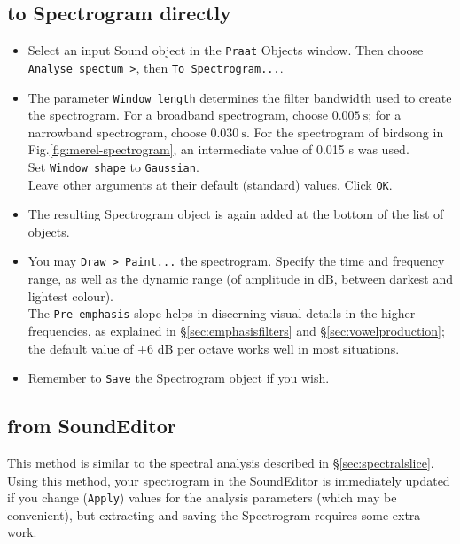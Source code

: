 \documentclass[
]{book}
\begin{document}
\subsection{to Spectrogram directly}\label{to-spectrogram-directly}

\begin{itemize}
\item
  Select an input Sound object in the \texttt{Praat} Objects window. Then choose \texttt{Analyse\ spectum\ \textgreater{}}, then \texttt{To\ Spectrogram...}.
\item
  The parameter \texttt{Window\ length} determines the filter bandwidth used to create the spectrogram. For a broadband spectrogram, choose \(0.005\ \textrm{s}\); for a narrowband spectrogram, choose \(0.030\ \textrm{s}\).
  For the spectrogram of birdsong in Fig.\ref{fig:merel-spectrogram}, an intermediate value of 0.015 s was used.\\
  Set \texttt{Window\ shape} to \texttt{Gaussian}.\\
  Leave other arguments at their default (standard) values. Click \texttt{OK}.
\item
  The resulting Spectrogram object is again added at the bottom of the list of objects.
\item
  You may \texttt{Draw\ \textgreater{}\ Paint...} the spectrogram. Specify the time and frequency range, as well as the dynamic range (of amplitude in dB, between darkest and lightest colour).\\
  The \texttt{Pre-emphasis} slope helps in discerning visual details in the higher frequencies, as explained in §\ref{sec:emphasisfilters} and §\ref{sec:vowelproduction}; the default value of \(+6\) dB per octave works well in most situations.
\item
  Remember to \texttt{Save} the Spectrogram object if you wish.
\end{itemize}

\subsection{from SoundEditor}\label{from-soundeditor}

This method is similar to the spectral analysis described in §\ref{sec:spectralslice}. Using this method, your spectrogram in the SoundEditor is immediately updated if you change (\texttt{Apply}) values for the analysis parameters (which may be convenient), but extracting and saving the Spectrogram requires some extra work.
\end{document}

